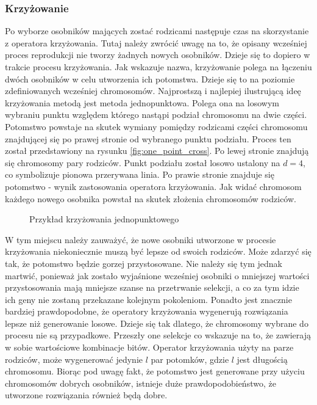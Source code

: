 \documentclass[twoside]{iisthesis}
\begin{document}
\subsubsection{Krzyżowanie}
Po wyborze osobników mających zostać rodzicami następuje czas na skorzystanie z operatora krzyżowania. Tutaj należy zwrócić uwagę na to, że opisany wcześniej proces reprodukcji nie tworzy żadnych nowych osobników. Dzieje się to dopiero w trakcie procesu krzyżowania. Jak wskazuje nazwa, krzyżowanie polega na łączeniu dwóch osobników w celu utworzenia ich potomstwa. Dzieje się to na poziomie zdefiniowanych wcześniej chromosomów. Najprostszą i najlepiej ilustrującą ideę krzyżowania metodą jest metoda jednopunktowa. Polega ona na losowym wybraniu punktu względem którego nastąpi podział chromosomu na dwie części. Potomstwo powstaje na skutek wymiany pomiędzy rodzicami części chromosomu znajdującej się po prawej stronie od wybranego punktu podziału. Proces ten został przedstawiony na rysunku \eqref{fig:one_point_cross}. Po lewej stronie znajdują się chromosomy pary rodziców. Punkt podziału został losowo ustalony na $d=4$, co symbolizuje pionowa przerywana linia. Po prawie stronie znajduje się potomstwo - wynik zastosowania operatora krzyżowania. Jak widać chromosom każdego nowego osobnika powstał na skutek złożenia chromosomów rodziców.
\begin{figure}[!htb]
	\centering
	\caption{Przykład krzyżowania jednopunktowego}
	\label{fig:one_point_cross}
\end{figure}

W tym miejscu należy zauważyć, że nowe osobniki utworzone w procesie krzyżowania niekoniecznie muszą być lepsze od swoich rodziców. Może zdarzyć się tak, że potomstwo będzie gorzej przystosowane. Nie należy się tym jednak martwić, ponieważ jak zostało wyjaśnione wcześniej osobniki o mniejszej wartości przystosowania mają mniejsze szanse na przetrwanie selekcji, a co za tym idzie ich geny nie zostaną przekazane kolejnym pokoleniom. Ponadto jest znacznie bardziej prawdopodobne, że operatory krzyżowania wygenerują rozwiązania lepsze niż generowanie losowe. Dzieje się tak dlatego, że chromosomy wybrane do procesu nie są przypadkowe. Przeszły one selekcje co wskazuje na to, że zawierają w sobie wartościowe kombinacje bitów. Operator krzyżowania użyty na parze rodziców, może wygenerować jedynie $l$ par potomków, gdzie $l$ jest długością chromosomu. Biorąc pod uwagę fakt, że potomstwo jest generowane przy użyciu chromosomów dobrych osobników, istnieje duże prawdopodobieństwo, że utworzone rozwiązania również będą dobre.
\end{document}
